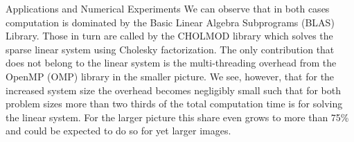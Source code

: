 \begin{chapter}{Applications and Numerical Experiments}
We can observe that in both cases computation is dominated by the Basic Linear Algebra Subprograms (BLAS) Library. Those in turn are called by the CHOLMOD library which solves the sparse
linear system using Cholesky factorization. The only contribution that does not belong to the linear system is the multi-threading overhead from the OpenMP (OMP) library in the smaller picture.
We see, however, that for the increased system size the overhead becomes negligibly small such that for both problem sizes more than two thirds of the total computation time is for solving the linear
system. For the larger picture this share even grows to more than 75\% and could be expected to do so for yet larger images.\\
\begin{figure}[h!]
    \centering
\end{figure}
\begin{table}[h!]
\centering
\footnotesize
\setlength{\tabcolsep}{3pt}
\end{table}
\end{chapter}

